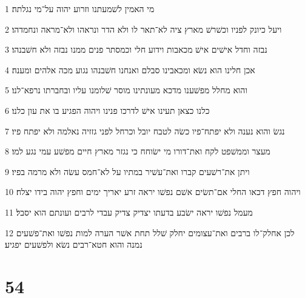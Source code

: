 \par 1 מי האמין לשׁמעתנו וזרוע יהוה על־מי נגלתה׃
\par 2 ויעל כיונק לפניו וכשׁרשׁ מארץ ציה לא־תאר לו ולא הדר ונראהו ולא־מראה ונחמדהו׃
\par 3 נבזה וחדל אישׁים אישׁ מכאבות וידוע חלי וכמסתר פנים ממנו נבזה ולא חשׁבנהו׃
\par 4 אכן חלינו הוא נשׂא ומכאבינו סבלם ואנחנו חשׁבנהו נגוע מכה אלהים ומענה׃
\par 5 והוא מחלל מפשׁענו מדכא מעונתינו מוסר שׁלומנו עליו ובחברתו נרפא־לנו׃
\par 6 כלנו כצאן תעינו אישׁ לדרכו פנינו ויהוה הפגיע בו את עון כלנו׃
\par 7 נגשׂ והוא נענה ולא יפתח־פיו כשׂה לטבח יובל וכרחל לפני גזזיה נאלמה ולא יפתח פיו׃
\par 8 מעצר וממשׁפט לקח ואת־דורו מי ישׂוחח כי נגזר מארץ חיים מפשׁע עמי נגע למו׃
\par 9 ויתן את־רשׁעים קברו ואת־עשׁיר במתיו על לא־חמס עשׂה ולא מרמה בפיו׃
\par 10 ויהוה חפץ דכאו החלי אם־תשׂים אשׁם נפשׁו יראה זרע יאריך ימים וחפץ יהוה בידו יצלח׃
\par 11 מעמל נפשׁו יראה ישׂבע בדעתו יצדיק צדיק עבדי לרבים ועונתם הוא יסבל׃
\par 12 לכן אחלק־לו ברבים ואת־עצומים יחלק שׁלל תחת אשׁר הערה למות נפשׁו ואת־פשׁעים נמנה והוא חטא־רבים נשׂא ולפשׁעים יפגיע׃

\chapter{54}

